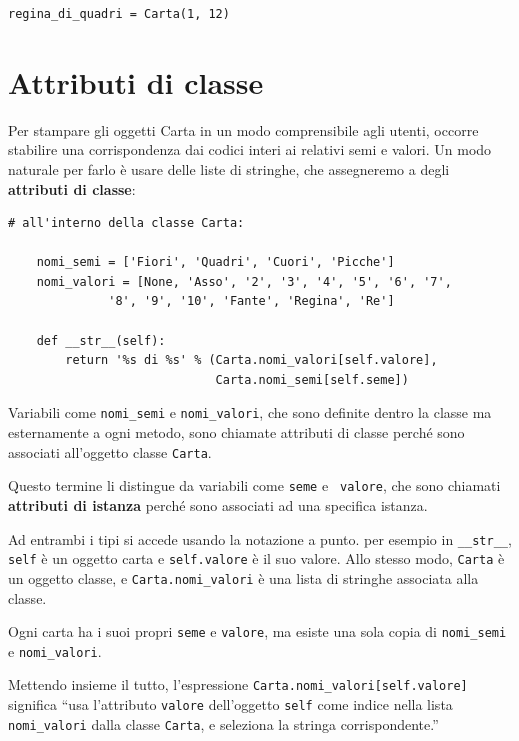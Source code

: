 \documentclass[10pt]{book}
\begin{document}
\begin{verbatim}
regina_di_quadri = Carta(1, 12)
\end{verbatim}
%


\section{Attributi di classe}
\label{class.attribute}

Per stampare gli oggetti Carta in un modo comprensibile agli utenti, occorre stabilire una corrispondenza dai codici interi ai relativi semi e valori. Un modo naturale per farlo è usare delle liste di stringhe, che assegneremo a degli {\bf attributi di classe}:

\begin{verbatim}
# all'interno della classe Carta:

    nomi_semi = ['Fiori', 'Quadri', 'Cuori', 'Picche']
    nomi_valori = [None, 'Asso', '2', '3', '4', '5', '6', '7', 
              '8', '9', '10', 'Fante', 'Regina', 'Re']

    def __str__(self):
        return '%s di %s' % (Carta.nomi_valori[self.valore],
                             Carta.nomi_semi[self.seme])
\end{verbatim}
%
Variabili come \verb"nomi_semi" e \verb"nomi_valori", che sono definite dentro la classe ma esternamente a ogni metodo, sono chiamate attributi di classe perché sono associati all'oggetto classe {\tt Carta}.

Questo termine li distingue da variabili come {\tt seme} e {\tt
  valore}, che sono chiamati {\bf attributi di istanza} perché sono associati ad una specifica istanza.

Ad entrambi i tipi si accede usando la notazione a punto. per esempio in \verb"__str__", {\tt self} è un oggetto carta e {\tt self.valore} è il suo valore.  Allo stesso modo, {\tt Carta} è un oggetto classe, e \verb"Carta.nomi_valori" è una lista di stringhe associata alla classe.

Ogni carta ha i suoi propri {\tt seme} e {\tt valore}, ma esiste una sola copia di \verb"nomi_semi" e \verb"nomi_valori".

Mettendo insieme il tutto, l'espressione
\verb"Carta.nomi_valori[self.valore]" significa ``usa l'attributo {\tt valore} dell'oggetto {\tt self} come indice nella lista \verb"nomi_valori"
dalla classe {\tt Carta}, e seleziona la stringa corrispondente.''
\end{document}
